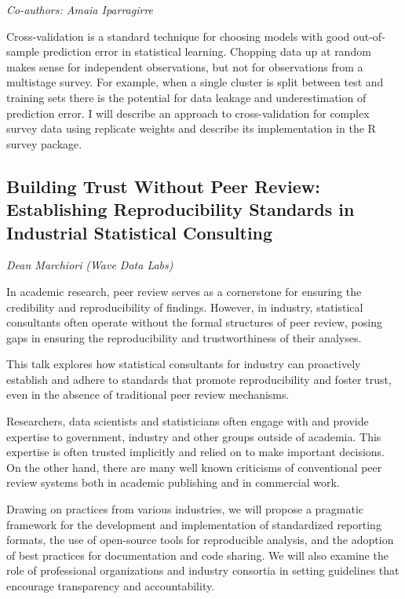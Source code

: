 \documentclass[
]{scrreprt}
\begin{document}
\emph{Co-authors: Amaia Iparragirre}

\setlength{\parskip}{0.5em}

Cross-validation is a standard technique for choosing models with good
out-of-sample prediction error in statistical learning. Chopping data up
at random makes sense for independent observations, but not for
observations from a multistage survey. For example, when a single
cluster is split between test and training sets there is the potential
for data leakage and underestimation of prediction error. I will
describe an approach to cross-validation for complex survey data using
replicate weights and describe its implementation in the R survey
package.

\subsection{Building Trust Without Peer Review: Establishing
Reproducibility Standards in Industrial Statistical
Consulting}\label{building-trust-without-peer-review-establishing-reproducibility-standards-in-industrial-statistical-consulting}

\emph{Dean Marchiori} \emph{(Wave Data Labs)}

\setlength{\parskip}{0.5em}

In academic research, peer review serves as a cornerstone for ensuring
the credibility and reproducibility of findings. However, in industry,
statistical consultants often operate without the formal structures of
peer review, posing gaps in ensuring the reproducibility and
trustworthiness of their analyses.

This talk explores how statistical consultants for industry can
proactively establish and adhere to standards that promote
reproducibility and foster trust, even in the absence of traditional
peer review mechanisms.

Researchers, data scientists and statisticians often engage with and
provide expertise to government, industry and other groups outside of
academia. This expertise is often trusted implicitly and relied on to
make important decisions. On the other hand, there are many well known
criticisms of conventional peer review systems both in academic
publishing and in commercial work.

Drawing on practices from various industries, we will propose a
pragmatic framework for the development and implementation of
standardized reporting formats, the use of open-source tools for
reproducible analysis, and the adoption of best practices for
documentation and code sharing. We will also examine the role of
professional organizations and industry consortia in setting guidelines
that encourage transparency and accountability.
\end{document}

